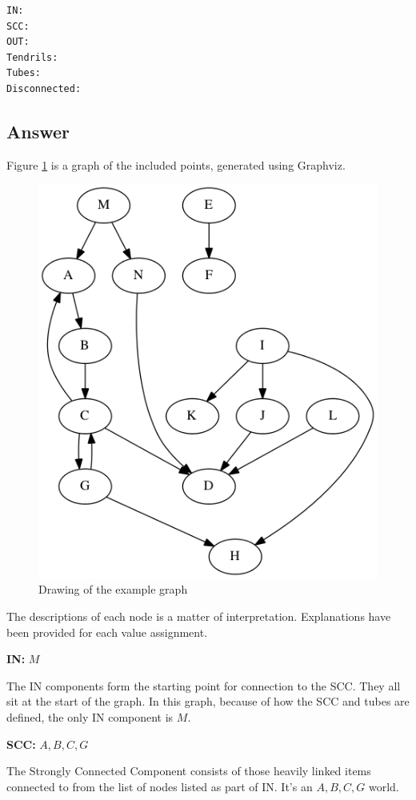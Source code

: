 \documentclass[letterpaper,11pt]{article}
\begin{document}
{\begin{verbatim}
IN: 
SCC: 
OUT: 
Tendrils: 
Tubes: 
Disconnected:
\end{verbatim}

\newpage
\subsection*{Answer}
Figure \ref{fig:q3graph} is a graph of the included points, generated using Graphviz.

\begin{figure}
\includegraphics[scale=0.5]{work/q3.png}
\caption{Drawing of the example graph}
\label{fig:q3graph}
\end{figure}

The descriptions of each node is a matter of interpretation.  Explanations have been provided for each value assignment.

\textbf{IN:}  $M$

The IN components form the starting point for connection to the SCC.  They all sit at the start of the graph.  In this graph, because of how the SCC and tubes are defined, the only IN component is $M$.

\textbf{SCC:}  $A, B, C, G$

The Strongly Connected Component consists of those heavily linked items connected to from the list of nodes listed as part of IN.  It's an $A, B, C, G$ world.

}
\end{document}
